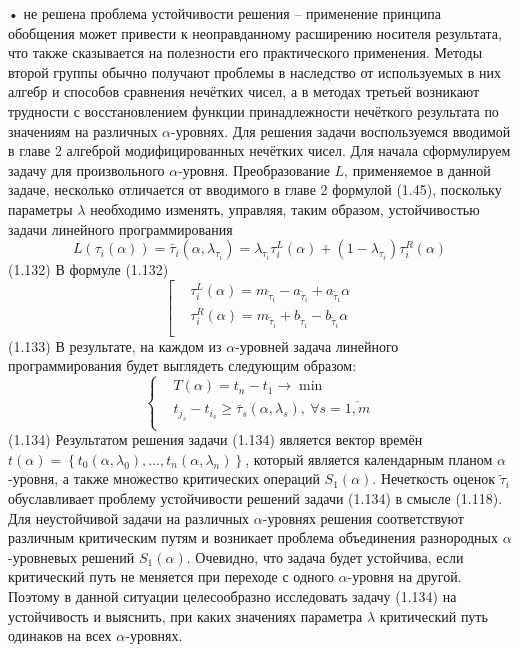 •	не решена проблема устойчивости решения – применение принципа обобщения может привести к неоправданному расширению носителя результата, что также сказывается на полезности его практического применения.
Методы второй группы обычно получают проблемы в наследство от используемых в них алгебр и способов сравнения нечётких чисел, а в методах третьей возникают трудности с восстановлением функции принадлежности нечёткого результата по значениям на различных $\alpha$-уровнях.
Для решения задачи воспользуемся вводимой в главе 2 алгеброй модифицированных нечётких чисел. Для начала сформулируем задачу для произвольного $\alpha$-уровня. Преобразование $L$, применяемое в данной задаче, несколько отличается от вводимого в главе 2 формулой (1.45), поскольку параметры $\lambda$ необходимо изменять, управляя, таким образом, устойчивостью задачи линейного программирования
	\[L({{\tau }_{i}}(\alpha ))={{\bar{\tau }}_{i}}(\alpha ,{{\lambda }_{{{\tau }_{i}}}})={{\lambda }_{{{\tau }_{i}}}}\tau _{i}^{L}(\alpha )+(1-{{\lambda }_{{{\tau }_{i}}}})\tau _{i}^{R}(\alpha )\] 	(1.132)
В формуле (1.132)
	\[\left[ \begin{aligned}
  & \tau _{i}^{L}(\alpha )={{m}_{{{{\tilde{\tau }}}_{i}}}}-{{a}_{{{{\tilde{\tau }}}_{i}}}}+{{a}_{{{{\tilde{\tau }}}_{i}}}}\alpha  \\ 
 & \tau _{i}^{R}(\alpha )={{m}_{{{{\tilde{\tau }}}_{i}}}}+{{b}_{{{{\tilde{\tau }}}_{i}}}}-{{b}_{{{{\tilde{\tau }}}_{i}}}}\alpha  \\ 
\end{aligned} \right.\] 	(1.133)
В результате, на каждом из $\alpha$-уровней задача линейного программирования будет выглядеть следующим образом:
	\[\left\{ \begin{aligned}
  & T(\alpha )={{t}_{n}}-{{t}_{1}}\to \min  \\ 
 & {{t}_{{{j}_{s}}}}-{{t}_{{{i}_{s}}}}\ge {{{\bar{\tau }}}_{s}}(\alpha ,{{\lambda }_{s}}),\ \forall s=\overline{1,m} \\ 
\end{aligned} \right.\] 	(1.134)
Результатом решения задачи (1.134) является вектор времён $t\left( \alpha  \right)=\left\{ {{t}_{0}}(\alpha ,{{\lambda }_{0}}),...,{{t}_{n}}(\alpha ,{{\lambda }_{n}}) \right\}$, который является календарным планом $\alpha$-уровня, а также множество критических операций ${{S}_{1}}\left( \alpha  \right)$. 
Нечеткость оценок ${{\tilde{\tau }}_{i}}$ обуславливает проблему устойчивости решений задачи (1.134) в смысле (1.118). Для неустойчивой задачи на различных $\alpha $-уровнях решения соответствуют различным критическим путям и возникает проблема объединения разнородных $\alpha $-уровневых решений ${{S}_{1}}\left( \alpha  \right)$. Очевидно, что задача будет устойчива, если критический путь не меняется при переходе с одного $\alpha $-уровня на другой. Поэтому в данной ситуации целесообразно исследовать задачу (1.134) на устойчивость и выяснить, при каких значениях параметра $\lambda $ критический путь одинаков на всех $\alpha $-уровнях. 

